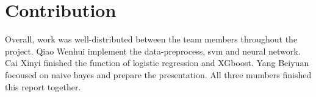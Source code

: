 \documentclass{article}
\begin{document}
\section{Contribution}
Overall, work was well-distributed between the team members throughout the project. Qiao Wenhui implement the data-preprocess, svm and neural network. Cai Xinyi finished the function of logistic regression and XGboost. Yang Beiyuan focoused on naive bayes and prepare the presentation. All three mumbers finished this report together.
\end{document}
